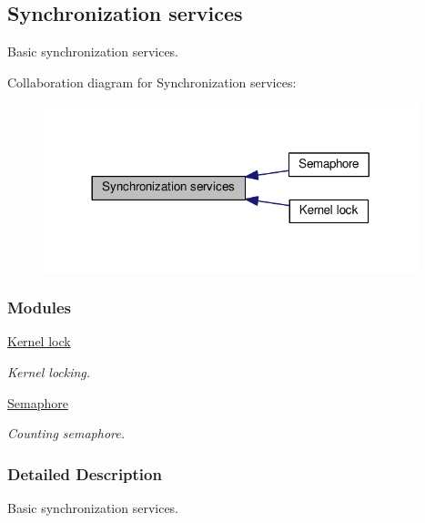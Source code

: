 \hypertarget{group__kern__sync}{\subsection{Synchronization services}
\label{group__kern__sync}
}


Basic synchronization services.  


Collaboration diagram for Synchronization services\-:\nopagebreak
\begin{figure}[H]
\begin{center}
\leavevmode
\includegraphics[width=308pt]{group__kern__sync}
\end{center}
\end{figure}
\subsubsection*{Modules}
\begin{DoxyCompactItemize}
\item 
\hyperlink{group__lock__intf}{Kernel lock}
\begin{DoxyCompactList}\small\item\em Kernel locking. \end{DoxyCompactList}\item 
\hyperlink{group__sem__intf}{Semaphore}
\begin{DoxyCompactList}\small\item\em Counting semaphore. \end{DoxyCompactList}\end{DoxyCompactItemize}


\subsubsection{Detailed Description}
Basic synchronization services. 